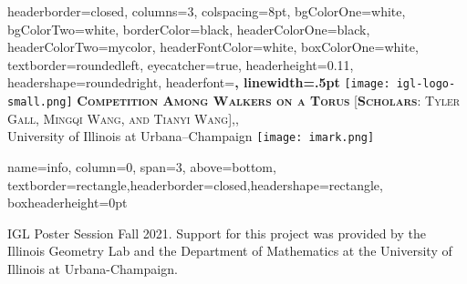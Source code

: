 \documentclass[landscape,fontscale=.5,paperwidth=36in,paperheight=24in]{baposter} %
\begin{document}
\begin{poster}
{
headerborder=closed, %
columns=3,
colspacing=8pt, %
bgColorOne=white, %
bgColorTwo=white, %
borderColor=black, %
headerColorOne=black, %
headerColorTwo=mycolor, %
headerFontColor=white, %
boxColorOne=white, %
textborder=roundedleft, %
eyecatcher=true, %
headerheight=0.11\textheight, %
headershape=roundedright, %
headerfont=\Large\bf\textsc, %
linewidth=.5pt %
}
%
{\texttt{[image: igl-logo-small.png]}} %
{\bf\textsc{Competition Among Walkers on a Torus}\vspace{0.5em}} %
{\textsc{[\textbf{Scholars}:  Tyler Gall, Mingqi Wang, and Tianyi Wang],,}\\[1ex]
University of Illinois at Urbana--Champaign} %
{\texttt{[image: imark.png]}} %

	\headerbox{}%
	{name=info, column=0, span=3, above=bottom, textborder=rectangle,headerborder=closed,headershape=rectangle, boxheaderheight=0pt}{
		\begin{center}
			IGL Poster Session Fall 2021. Support for this project was provided by the Illinois Geometry Lab and the Department of Mathematics at the University of Illinois at Urbana-Champaign.
		\end{center}
	}



\end{poster}
\end{document}
